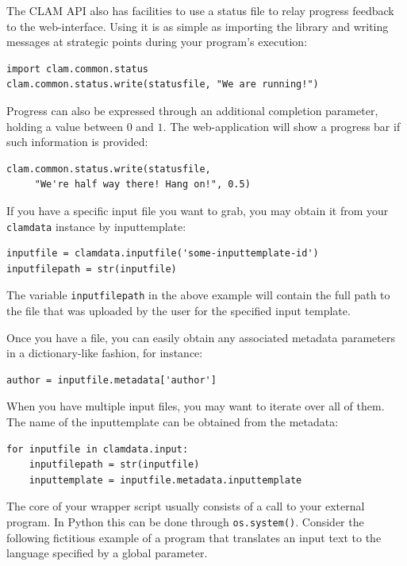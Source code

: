 \documentclass[a4paper,12pt,twoside,openright]{report}
\begin{document}
The CLAM API also has facilities to use a status file to relay progress
feedback to the web-interface. Using it is as simple as importing the library
and writing messages at strategic points during your program's execution:

{ \small
\begin{verbatim}
import clam.common.status
clam.common.status.write(statusfile, "We are running!")
\end{verbatim}
}

Progress can also be expressed through an additional completion parameter,
holding a value between $0$ and $1$. The web-application will show a progress bar if
such information is provided:

{ \small
\begin{verbatim}
clam.common.status.write(statusfile, 
     "We're half way there! Hang on!", 0.5)
\end{verbatim}
}

If you have a specific input file you want to grab, you may obtain it from your
\texttt{clamdata} instance by inputtemplate:

{ \small
\begin{verbatim}
inputfile = clamdata.inputfile('some-inputtemplate-id')
inputfilepath = str(inputfile) 
\end{verbatim}
}

The variable \texttt{inputfilepath} in the above example will contain the full
path to the file that was uploaded by the user for the specified input
template.

Once you have a file, you can easily obtain any associated metadata parameters in a
dictionary-like fashion, for instance:

{ \small
\begin{verbatim}
author = inputfile.metadata['author']
\end{verbatim}
}

When you have multiple input files, you may want to iterate over all of them.
The name of the inputtemplate can be obtained from the metadata:

{ \small
\begin{verbatim}
for inputfile in clamdata.input:
    inputfilepath = str(inputfile)
    inputtemplate = inputfile.metadata.inputtemplate
\end{verbatim}
}
  
The core of your wrapper script usually consists of a call to your external
program. In Python this can be done through \texttt{os.system()}. Consider the
following fictitious example of a program that translates an input text to the
language specified by a global parameter.
\end{document}
